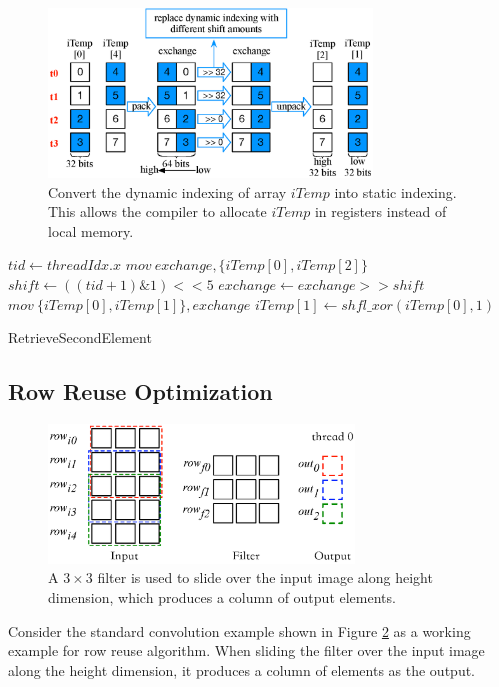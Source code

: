 \begin{figure}[t!]
	\centering
	\includegraphics[width=\columnwidth,height=4.5cm]{./figure/exchange.eps}
\caption{Convert the dynamic indexing of array $iTemp$ into static indexing. This allows the compiler to allocate $iTemp$ in registers instead of local memory.}
\label{fig:exchange}
\end{figure}


\begin{algorithm}[t!]
	$tid \gets threadIdx.x$\;
	$mov\ exchange, \{iTemp[0], iTemp[2]\}$\;
	$shift \gets ((tid+1)\&1)<<5$\;
	$exchange \gets exchange >> shift$\;
	$mov\ \{iTemp[0],iTemp[1]\}, exchange$\;
	$iTemp[1] \gets shfl\_xor(iTemp[0],1)$\;	
	\caption{RetrieveSecondElement}
	\label{algo:basic2}
\end{algorithm}


\subsection{Row Reuse Optimization}
\label{sec:rowreuse}
\begin{figure}
	\centering
	\includegraphics[width=0.9\columnwidth,height=3.7cm]{./figure/rowreuse.eps}
\caption{A $3 \times 3$ filter is used to slide over the input image along height dimension, which produces a column of output elements.}
\label{fig:rowreuse}
\end{figure}

 Consider the standard convolution example shown in Figure \ref{fig:rowreuse} as a working example for row reuse
algorithm. When sliding the filter over the input image along the height dimension, it produces a column of elements as the output.


